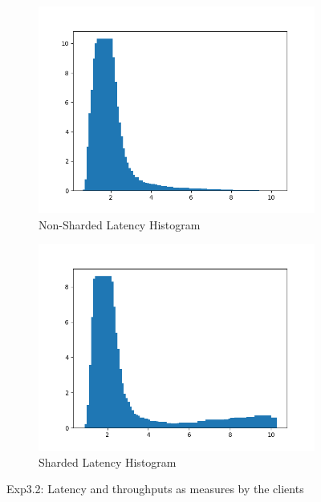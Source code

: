 \documentclass[11pt,a4paper]{article}
\begin{document}
\begin{figure}[H]
\centering
\begin{subfigure}{.5\textwidth}
    \centering
    \includegraphics[width=\textwidth]{img/exp5_1/histogram_client_nonsharded.png}
    \caption{Non-Sharded Latency Histogram}
    \label{fig:mesh1}
\end{subfigure}%
\begin{subfigure}{.5\textwidth}
      \centering
    \includegraphics[width=\textwidth]{img/exp5_1/histogram_client_sharded.png}
    \caption{Sharded Latency Histogram}
    \label{fig:mesh1}
\end{subfigure}
\caption{Exp3.2: Latency and throughputs as measures by the clients}
\label{fig:test}
\end{figure}
\end{document}

